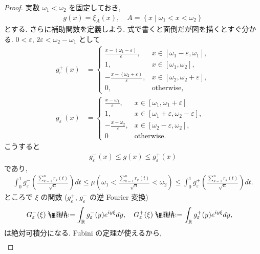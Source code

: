 \documentclass[openany, a4paper, oneside]{jsbook}
\makeatletter
\newcommand*{\defeq}{\mathrel{\rlap{%
\raisebox{0.3ex}{$\m@th\cdot$}}%
\raisebox{-0.3ex}{$\m@th\cdot$}}%
=}
\theoremstyle{break}
\theoremstyle{breakdefn}
\newcommand{\rbk}[1]{\left (#1\right)}
\newcommand{\sqbk}[1]{\left[#1\right]}
\newcommand{\relmiddle}[1]{\mathrel{}\middle#1\mathrel{}}
\newcommand{\set}[2]{\left\{#1 \relmiddle| #2\right\}}
\newcommand{\bbR}{\mathbb{R}}
\newcommand{\gvarepsilonminus}{g_{\varepsilon}^{-}}
\newcommand{\gvarepsilonplus}{g_{\varepsilon}^{+}}
\makeatother
\begin{document}
\begin{proof}
実数 $\omega_1 < \omega_2$ を固定しておき,
\begin{align}
 g (x)
 =
 \xi_{A} (x), \quad A = \set{x}{\omega_1 < x < \omega_2}
\end{align}
とする.
さらに補助関数を定義しよう.
式で書くと面倒だが図を描くとすぐ分かる.
$0 < \varepsilon$, $2 \varepsilon < \omega_2 - \omega_1$ として
\begin{align}
 g_{\varepsilon}^{+}(x)
 &=
 \begin{cases}
  \frac{x - \rbk{\omega_1 - \varepsilon}}{\varepsilon}, & x \in \sqbk{\omega_1 - \varepsilon, \omega_1}, \\
  1, & x \in \sqbk{\omega_1, \omega_2}, \\
  -\frac{x - \rbk{\omega_2 + \varepsilon}}{\varepsilon}, & x \in \sqbk{\omega_2, \omega_2 + \varepsilon}, \\
  0, & \text{otherwise},
 \end{cases} \\
 g_{\varepsilon}^{-}(x)
 &=
 \begin{cases}
  \frac{x - \omega_1}{\varepsilon}, & x \in \sqbk{\omega_1, \omega_1 + \varepsilon} \\
  1, & x \in \sqbk{\omega_1 + \varepsilon, \omega_2 - \varepsilon}, \\
  -\frac{x - \omega_2}{\varepsilon}, & x \in \sqbk{\omega_2 - \varepsilon, \omega_2}, \\
  0 & \text{otherwise}.
 \end{cases}
\end{align}
こうすると
\begin{align}
 g_{\varepsilon}^{-} (x) \leq g (x) \leq g_{\varepsilon}^{+}(x)
\end{align}
であり,
\begin{align}
 \int_0^1 g_{\varepsilon}^{-} \rbk{\frac{\sum_{k=1}^{n} r_k (t)}{\sqrt{n}}} dt
 \leq
 \mu \rbk{\omega_1 < \frac{\sum_{k=1}^{n} r_k (t)}{\sqrt{n}} < \omega_2}
 \leq
 \int_0^1 g_{\varepsilon}^{+} \rbk{\frac{\sum_{k=1}^{n} r_k (t)}{\sqrt{n}}} dt.
\end{align}
ところで $\xi$ の関数 ($\gvarepsilonplus$, $\gvarepsilonminus$ の逆 Fourier 変換)
\begin{align}
 G_{\varepsilon}^{-} (\xi)
 \defeq
 \int_{\bbR} \gvarepsilonminus (y) e^{iy \xi} dy, \quad
 G_{\varepsilon}^{+} (\xi)
 \defeq
 \int_{\bbR} \gvarepsilonplus (y) e^{iy \xi} dy, \quad
\end{align}
は絶対可積分になる.
Fubini の定理が使えるから,
\begin{align}

\end{align}
\end{proof}
\end{document}
